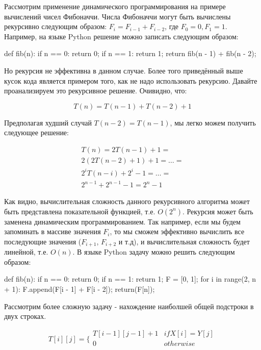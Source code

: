 Рассмотрим применение динамического программирования на примере вычислений чисел Фибоначчи. Числа 
Фибоначчи могут быть вычислены рекурсивно следующим образом: $F_i = F_{i-1} + F_{i-2}$, 
где $F_0=0, F_1=1$. Например, на языке Python решение можно записать следующим образом:

\begin{python}
def fib(n):
	if n == 0:
		return 0;
	if n == 1:
		return 1;
	return fib(n - 1) + fib(n - 2);
\end{python}

Но рекурсия не эффективна в данном случае. Более того приведённый выше кусок кода 
является примером того, как не надо использовать рекурсию. Давайте проанализируем это 
рекурсивное решение. Очивидно, что:

$$
T(n) = T(n-1) + T(n-2) + 1
$$

Предполагая худший случай $T(n-2)=T(n-1)$, мы легко можем получить следующее решение:

\begin{equation*}
\begin{multlined}
T(n) = 2T(n-1) + 1= \\
	   2(2T(n-2) + 1) + 1 = 
	   \ldots = \\
	   2^{i}T(n-i) + 2^{i} - 1 = 
	   \ldots = \\
	   2^{n-1} + 2^{n-1} - 1 = 
	   2^{n} - 1
\end{multlined}
\end{equation*}

Как видно, вычислительная сложность данного рекурсивного алгоритма 
может быть представлена показательной функцией, т.е. $O(2^n)$. Рекурсия может 
быть заменена динамическим программированием. 
Так например, если мы будем запоминать в массиве значения $F_i$, то мы сможем
эффективно вычислить все последующие значения ($F_{i+1}$, $F_{i+2}$ и т.д), и 
вычислительная сложность будет линейной, т.е. $O(n)$. В языке Python задачу 
можно решить следующим образом:

\begin{python}
def fib(n):
	if n == 0:
		return 0;
	if n == 1:
		return 1;
	F = [0, 1];
	for i in range(2, n + 1):
		F.append(F[i - 1] + F[i - 2]);
	return(F[n]);
\end{python}


Рассмотрим более сложную задачу - нахождение наиболшей общей подстроки в двух строках.

$$
T[i][j] = \Bigg\{
	\begin{array}{cc}
      T[i - 1][j - 1] + 1 & if X[i] = Y[j] \\
      0 & otherwise \\
    \end{array}
$$

